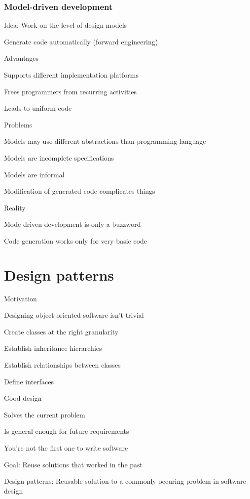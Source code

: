 \documentclass[10pt]{article}
\begin{document}
\subsubsection{Model-driven development}
\enumstart
	\item Idea: Work on the level of design models
	\item Generate code automatically (forward engineering)
	\item Advantages
	\enumstart
		\item Supports different implementation platforms
		\item Frees programmers from recurring activities
		\item Leads to uniform code
	\enumend
	\item Problems
	\enumstart
		\item Models may use different abstractions than programming language
		\item Models are incomplete specifications
		\item Models are informal
		\item Modification of generated code complicates things
	\enumend
	\item Reality
	\enumstart
		\item Mode-driven development is only a buzzword
		\item Code generation works only for very basic code
	\enumend
\enumend

\section{Design patterns}
\enumstart
	\item Motivation
	\enumstart
		\item Designing object-oriented software isn't trivial
		\enumstart
			\item Create classes at the right granularity
			\item Establish inheritance hierarchies
			\item Establish relationships between classes
			\item Define interfaces
		\enumend
		\item Good design
		\enumstart
			\item Solves the current problem
			\item Is general enough for future requirements
		\enumend
		\item You're not the first one to write software
		\item Goal: Reuse solutions that worked in the past
		\item Design patterns: Reusable solution to a commonly occuring problem in software design
	\enumend
\enumend
\end{document}
